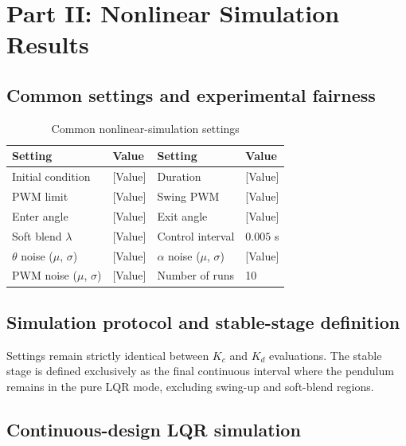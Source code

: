\documentclass[12pt,a4paper]{article}
\begin{document}
\section{Part II: Nonlinear Simulation Results}

\subsection{Common settings and experimental fairness}

\begin{table}[h!]
    \centering
    \caption{Common nonlinear-simulation settings}
    \begin{tabular}{ll|ll}
        \toprule
        \textbf{Setting} & \textbf{Value} & \textbf{Setting} & \textbf{Value} \\
        \midrule
        Initial condition & [Value] & Duration & [Value] \\
        PWM limit & [Value] & Swing PWM & [Value] \\
        Enter angle & [Value] & Exit angle & [Value] \\
        Soft blend $\lambda$ & [Value] & Control interval & $0.005$ s \\
        $\theta$ noise ($\mu$, $\sigma$) & [Value] & $\alpha$ noise ($\mu$, $\sigma$) & [Value] \\
        PWM noise ($\mu$, $\sigma$) & [Value] & Number of runs & 10 \\
        \bottomrule
    \end{tabular}
\end{table}

\subsection{Simulation protocol and stable-stage definition}
Settings remain strictly identical between $K_c$ and $K_d$ evaluations. The stable stage is defined exclusively as the final continuous interval where the pendulum remains in the pure LQR mode, excluding swing-up and soft-blend regions. 

\subsection{Continuous-design LQR simulation}
\end{document}

